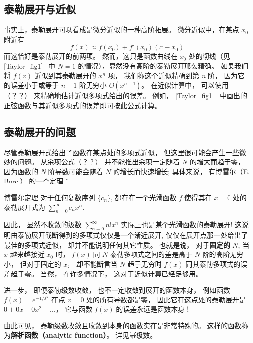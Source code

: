 
\begin{issues}
\end{issues}



\subsection{泰勒展开与近似}
事实上，泰勒展开可以看成是微分近似的一种高阶拓展。 微分近似中，在某点 $x_0$ 附近有
\begin{equation}
f(x) \approx f(x_0) + f'(x_0)(x - x_0)
\end{equation}
而这恰好是泰勒展开的前两项。 然而，这只是函数曲线在 $x_0$ 处的切线（见\autoref{Taylor_fig1}~ 中 $N=1$ 的情况），显然没有高阶的泰勒展开那么精确。 如果我们将 $f(x)$ 近似到其泰勒展开的 $x^n$ 项， 我们称这个近似精确到第 $n$ 阶， 因为它的误差小于或等于 $n + 1$ 阶无穷小 $O(x^{n + 1})$。 在近似计算中， 可以使用（？？） 来精确地估计近似多项式给出的误差。 例如， \autoref{Taylor_fig1}~ 中画出的正弦函数与其近似多项式的误差即可按此公式计算。

\subsection{泰勒展开的问题}
尽管泰勒展开式给出了函数在某点处的多项式近似， 但这里很可能会产生一些微妙的问题。 从余项公式（？？） 并不能推出余项一定随着 $N$ 的增大而趋于零， 因为函数的 $N$ 阶导数可能会随着 $N$ 的增长而快速增长; 具体来说， 有博雷尔（E. Borel） 的一个定理：
\begin{theorem}{博雷尔定理}
对于任何复数序列 $\{c_n\}$, 都存在一个光滑函数 $f$ 使得其在 $x=0$ 处的泰勒展开式为 $\sum_{n=0}^\infty c_nx^n$.
\end{theorem}
因此， 显然不收敛的级数 $\sum_{n=0}^\infty n!x^n$ 实际上也是某个光滑函数的泰勒展开! 这说明由泰勒展开截断得到的多项式仅仅是一个渐近展开, 仅仅在展开点那一处给出了最佳的多项式近似， 却并不能说明任何其它性质。 也就是说， 对于\textbf{固定的 $N$}, 当 $x$ 越来越接近 $x_0$ 时， $f(x)$ 同 $N$ 泰勒多项式之间的差是高于 $N$ 阶的高阶无穷小， 但对于固定的 $x$， 却不能断言当 $N$ 趋于无穷时 $f(x)$ 同其泰勒多项式的误差趋于零。 当然， 在许多情况下， 这对于近似计算已经足够用。

进一步， 即便泰勒级数收敛， 也不一定收敛到展开的函数本身， 例如函数 $f(x)=e^{-1/x^2}$ 在点 $x=0$ 处的所有导数都是零， 因此它在这点处的泰勒展开是 $0+0x+0x^2+...$， 它与函数 $f(x)$ 的误差永远是函数本身！

由此可见， 泰勒级数收敛且收敛到本身的函数实在是非常特殊的。 这样的函数称为\textbf{解析函数（analytic function）}。 详见幂级数。
